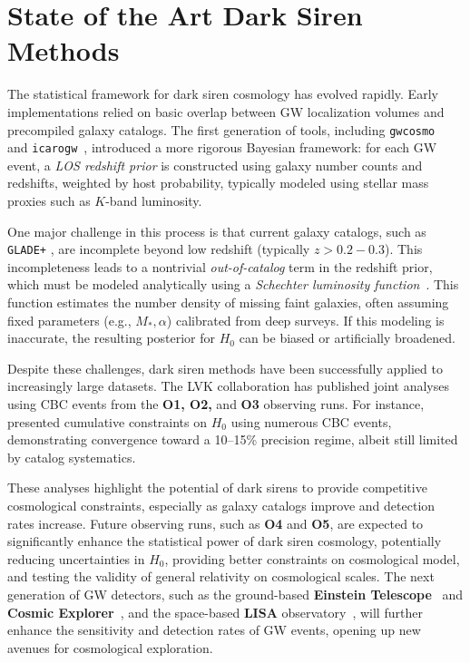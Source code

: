 \section{State of the Art Dark Siren Methods}
The statistical framework for dark siren cosmology has evolved rapidly. Early implementations relied on basic overlap between GW localization volumes and precompiled galaxy catalogs. The first generation of tools, including \texttt{gwcosmo}~\citep{gray2020cosmological, gray2022pixelated, gray2023joint} and \texttt{icarogw}~\citep{mastrogiovanni2021importance, mastrogiovanni2024icarogw}, introduced a more rigorous Bayesian framework: for each \ac{GW} event, a \textit{\ac{LOS} redshift prior} is constructed using galaxy number counts and redshifts, weighted by host probability, typically modeled using stellar mass proxies such as $K$-band luminosity.

One major challenge in this process is that current galaxy catalogs, such as \texttt{GLADE+} \citep{dalya2022glade+}, are incomplete beyond low redshift (typically $ z > 0.2 - 0.3$). This incompleteness leads to a nontrivial \textit{out-of-catalog} term in the redshift prior, which must be modeled analytically using a \textit{Schechter luminosity function}~\citep{gray2023joint, chen2024testing}. This function estimates the number density of missing faint galaxies, often assuming fixed parameters (e.g., $M_*,\alpha$) calibrated from deep surveys. If this modeling is inaccurate, the resulting posterior for $H_0$ can be biased or artificially broadened.

Despite these challenges, dark siren methods have been successfully applied to increasingly large datasets. The \ac{LVK} collaboration has published joint analyses using \ac{CBC} events from the \textbf{O1, O2,} and \textbf{O3} observing runs. For instance,~\citet{abbott2021gravitational, abbott2023constraints} presented cumulative constraints on $H_0$ using numerous \ac{CBC} events, demonstrating convergence toward a 10--15\% precision regime, albeit still limited by catalog systematics.

These analyses highlight the potential of dark sirens to provide competitive cosmological constraints, especially as galaxy catalogs improve and detection rates increase. Future observing runs, such as \textbf{O4} and \textbf{O5}, are expected to significantly enhance the statistical power of dark siren cosmology, potentially reducing uncertainties in $H_0$, providing better constraints on cosmological model, and testing the validity of general relativity on cosmological scales. The next generation of \ac{GW} detectors, such as the ground-based \textbf{Einstein Telescope}~\citep{Abac:ET} and \textbf{Cosmic Explorer}~\citep{Evans:CE}, and the space-based \textbf{LISA} observatory~\citep{LISA:2024hlh}, will further enhance the sensitivity and detection rates of \ac{GW} events, opening up new avenues for cosmological exploration.

